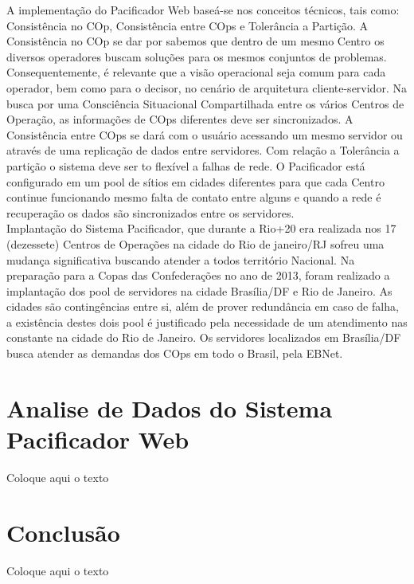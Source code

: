 \hspace{1.5cm}
A implementação do Pacificador Web baseá-se nos conceitos técnicos, tais como: Consistência no COp, Consistência entre COps e Tolerância a Partição. A Consistência no COp se dar por sabemos que dentro de um mesmo Centro os diversos operadores buscam soluções para os mesmos conjuntos de problemas. Consequentemente, é relevante que a visão operacional seja comum para cada operador, bem como para o decisor, no cenário de arquitetura cliente-servidor. Na busca por uma Consciência Situacional Compartilhada entre os vários Centros de Operação, as informações de COps diferentes deve ser sincronizados. A Consistência entre COps se dará com o usuário acessando um mesmo servidor ou através de uma replicação de dados entre servidores. Com relação a Tolerância a partição o sistema deve ser to flexível a falhas de rede. O Pacificador está configurado em um pool de sítios em cidades diferentes para que cada Centro continue funcionando mesmo falta de contato entre alguns e quando a rede é recuperação os dados são sincronizados entre os servidores.\\

\hspace{1.5cm}
Implantação do Sistema Pacificador, que durante a Rio+20 era realizada nos 17 (dezessete) Centros de Operações na cidade do Rio de janeiro/RJ sofreu uma mudança significativa buscando atender a todos território Nacional. Na preparação para a Copas das Confederações no ano de 2013, foram realizado a implantação dos pool de servidores na cidade Brasília/DF e Rio de Janeiro. As cidades são contingências entre si, além de prover redundância em caso de falha, a existência destes dois pool é justificado pela necessidade de um atendimento nas constante na cidade do Rio de Janeiro. Os servidores localizados em Brasília/DF busca atender as demandas dos COps em todo o Brasil, pela EBNet.\\

\section*{Analise de Dados do Sistema Pacificador Web}
\hspace{1.5cm}
Coloque aqui o texto\\


\section*{Conclusão}
\hspace{1.5cm}
Coloque aqui o texto\\